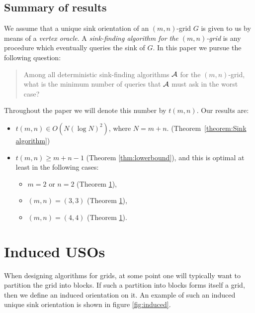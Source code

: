 \documentclass[a4paper,10pt]{article}
\newtheorem{lemma}{Lemma}
\newcommand{\JN}[1]{\marginpar{\parbox{4cm}{{\small {\bf JN:} #1}}}} %
\begin{document}


\subsection{Summary of results}

We assume that a unique sink orientation of an $(m,n)$-grid $G$ is given to
us by means of a \emph{vertex oracle}.
A \emph{sink-finding algorithm for the $(m,n)$-grid} is any procedure which
eventually queries the sink of $G$.
In this paper we pursue the following question:
\begin{quote}
    Among all deterministic sink-finding algorithms $\cal A$ for the
    $(m,n)$-grid, what is the minimum number of queries that $\cal A$ must ask
    in the worst case?
\end{quote}
Throughout the paper we will denote this number by $t(m,n)$.
Our results are:

\begin{itemize}
    \item
        $t(m,n) \in O(N (\log N)^2)$, where $N = m+n$. (Theorem~\ref{theorem:Sink algorithm})
    \item
        $t(m,n) \ge m+n-1$ (Theorem \ref{thm:lowerbound}), and this is optimal at least in
        the following cases:
        \begin{itemize}
            \item $m=2$ or $n=2$ (Theorem \ref{}),
            \item $(m,n) = (3,3)$ (Theorem \ref{}),
            \item $(m,n) = (4,4)$ (Theorem \ref{}).
        \end{itemize}
\end{itemize}

\section{Induced USOs}

When designing algorithms for grids, at some point one will typically want to
partition the grid into blocks.
If such a partition into blocks forms itself a grid,
then we define an induced orientation on it.
An example of such an induced unique sink orientation is shown in figure
\ref{fig:induced}.
\end{document}
